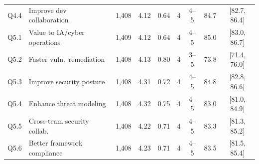 \begin{table}[ht]
\begin{tabular}{@{}llrrrccrc@{}}
Q4.4 & Improve dev collaboration & 1{,}408 & 4.12 & 0.64 & 4 & 4--5 & 84.7 & [82.7, 86.4] \\
Q5.1 & Value to IA/cyber operations & 1{,}409 & 4.12 & 0.64 & 4 & 4--5 & 85.0 & [83.0, 86.7] \\
Q5.2 & Faster vuln.\ remediation & 1{,}408 & 4.13 & 0.80 & 4 & 3--5 & 73.8 & [71.4, 76.0] \\
Q5.3 & Improve security posture & 1{,}408 & 4.31 & 0.72 & 4 & 4--5 & 84.8 & [82.8, 86.6] \\
Q5.4 & Enhance threat modeling & 1{,}408 & 4.32 & 0.75 & 4 & 4--5 & 83.0 & [81.0, 84.9] \\
Q5.5 & Cross-team security collab. & 1{,}408 & 4.22 & 0.71 & 4 & 4--5 & 83.3 & [81.3, 85.2] \\
Q5.6 & Better framework compliance & 1{,}408 & 4.23 & 0.71 & 4 & 4--5 & 83.5 & [81.5, 85.4] \\
\bottomrule
\end{tabular}
\end{table}
